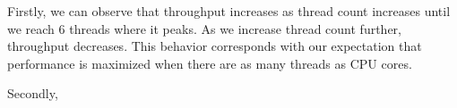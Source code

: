 Firstly, we can observe that throughput increases as thread count increases until we reach 6 threads where it peaks. As we increase thread count further, throughput decreases. This behavior corresponds with our expectation that performance is maximized when there are as many threads as CPU cores.

Secondly,






